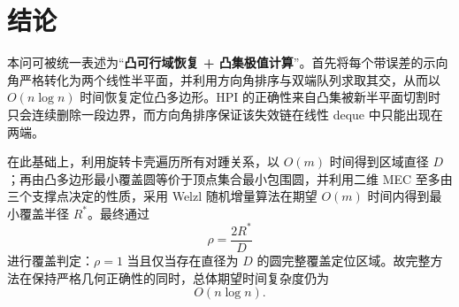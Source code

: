 \documentclass[UTF8,12pt,a4paper]{ctexart}
\theoremstyle{definition}
\begin{document}
\section{结论}

本问可被统一表述为“\textbf{凸可行域恢复 + 凸集极值计算}”。首先将每个带误差的示向角严格转化为两个线性半平面，并利用方向角排序与双端队列求取其交，从而以 $O(n\log n)$ 时间恢复定位凸多边形。HPI 的正确性来自凸集被新半平面切割时只会连续删除一段边界，而方向角排序保证该失效链在线性 deque 中只能出现在两端。

在此基础上，利用旋转卡壳遍历所有对踵关系，以 $O(m)$ 时间得到区域直径 $D$；再由凸多边形最小覆盖圆等价于顶点集合最小包围圆，并利用二维 MEC 至多由三个支撑点决定的性质，采用 Welzl 随机增量算法在期望 $O(m)$ 时间内得到最小覆盖半径 $R^*$。最终通过
\[
\boxed{\rho=\frac{2R^*}{D}}
\]
进行覆盖判定：$\rho=1$ 当且仅当存在直径为 $D$ 的圆完整覆盖定位区域。故完整方法在保持严格几何正确性的同时，总体期望时间复杂度仍为
\[
\boxed{O(n\log n)}.
\]
\end{document}
